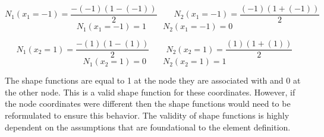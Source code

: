 \documentclass[../main.tex]{subfiles}
\begin{document}
\[
    N_1(x_1=-1) =  \frac{-(-1)(1-(-1))}{2} \quad\quad N_2(x_1=-1) = \frac{(-1)(1+(-1))}{2}
\]
\[
    N_1(x_1=-1) =  1 \quad\quad N_2(x_1=-1) = 0
\]

\[
    N_1(x_2=1) =  \frac{-(1)(1-(1))}{2} \quad\quad N_2(x_2=1) = \frac{(1)(1+(1))}{2}
\]
\[
    N_1(x_2=1) = 0 \quad\quad N_2(x_2=1) = 1
\]

The shape functions are equal to 1 at the node they are associated with and 0 at the other node.
This is a valid shape function for these coordinates.
However, if the node coordinates were different then the shape functions would need to be reformulated to ensure this behavior.
The validity of shape functions is highly dependent on the assumptions that are foundational to the element definition.
\end{document}
